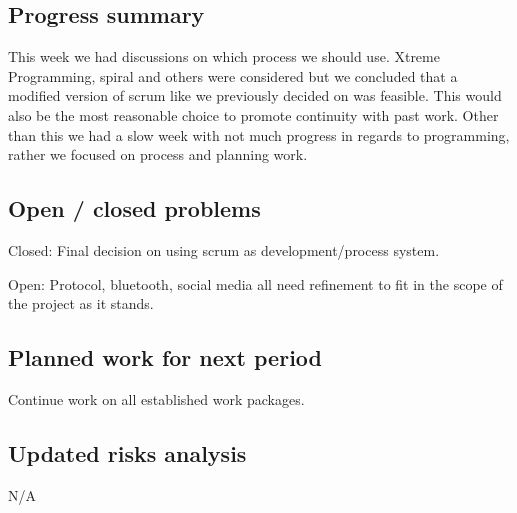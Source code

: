 \subsection{Progress summary}
This week we had discussions on which process we should use. Xtreme Programming, spiral and others were considered but we concluded that a modified version of scrum like we previously decided on was feasible. This would also be the most reasonable choice to promote continuity with past work. Other than this we had a slow week with not much progress in regards to programming, rather we focused on process and planning work.

\subsection{Open / closed problems}
Closed: Final decision on using scrum as development/process system. 

Open:
Protocol, bluetooth, social media all need refinement to fit in the scope of the project as it stands.


\subsection{Planned work for next period}
Continue work on all established work packages.

\subsection{Updated risks analysis}
N/A